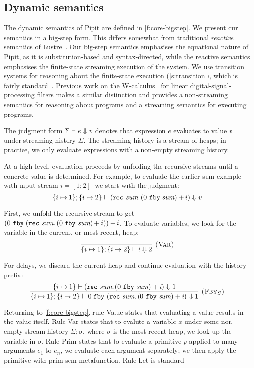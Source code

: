 \subsection{Dynamic semantics}
\label{s:core:dynamic}


The dynamic semantics of Pipit are defined in \autoref{f:core-bigstep}.
We present our semantics in a big-step form.
This differs somewhat from traditional \emph{reactive} semantics of Lustre~\cite{caspi1995functional}.
Our big-step semantics emphasises the equational nature of Pipit, as it is substitution-based and syntax-directed, while the reactive semantics emphasises the finite-state streaming execution of the system.
We use transition systems for reasoning about the finite-state execution (\autoref{s:transition}), which is fairly standard~\cite{brun2023equation,champion2016kind2,raymond2008synchronous}.
Previous work on the {\sc W-calculus}~\cite{gallego2021w} for linear digital-signal-processing filters makes a similar distinction and provides a non-streaming semantics for reasoning about programs and a streaming semantics for executing programs.


The judgment form $\Sigma \vdash e \Downarrow v$ denotes that expression $e$ evaluates to value $v$ under streaming history $\Sigma$.
The streaming history is a stream of heaps; in practice, we only evaluate expressions with a non-empty streaming history.

At a high level, evaluation proceeds by unfolding the recursive streams until a concrete value is determined.
For example, to evaluate the earlier sum example with input stream $i = [1; 2]$, we start with the judgment:
$$
\{ i \mapsto 1 \}; \{ i \mapsto 2 \} \vdash (\texttt{rec}~\textit{sum}.\, (0~\texttt{fby}~\textit{sum}) + i) \Downarrow v
$$

First, we unfold the recursive stream to get $(0~\texttt{fby}~(\texttt{rec}~\textit{sum}.\, (0~\texttt{fby}~\textit{sum}) + i)) + i$.
To evaluate variables, we look for the variable in the current, or most recent, heap:
$$
\enskip \frac {\displaystyle 
} {\displaystyle 
  \{ i \mapsto 1 \}; \{ i \mapsto 2 \} \vdash i \Downarrow 2
} \  \textsc{(Var)} \enskip
$$

For delays, we discard the current heap and continue evaluation with the history prefix:
$$
\enskip \frac {\displaystyle 
  \{ i \mapsto 1 \} \vdash (\texttt{rec}~\textit{sum}.\, (0~\texttt{fby}~\textit{sum}) + i) \Downarrow 1
} {\displaystyle 
  \{ i \mapsto 1 \}; \{ i \mapsto 2 \} \vdash 0~\texttt{fby}~(\texttt{rec}~\textit{sum}.\, (0~\texttt{fby}~\textit{sum}) + i) \Downarrow 1
} \  \textsc{($\mbox{Fby}_S$)} \enskip
$$

Returning to \autoref{f:core-bigstep}, rule {\sc Value} states that evaluating a value results in the value itself.
Rule {\sc Var} states that to evalute a variable $x$ under some non-empty stream history $\Sigma; \sigma$, where $\sigma$ is the most recent heap, we look up the variable in $\sigma$.
Rule {\sc Prim} states that to evaluate a primitive $p$ applied to many arguments $e_1$ to $e_n$, we evaluate each argument separately; we then apply the primitive with prim-sem metafunction.
Rule {\sc Let} is standard.


